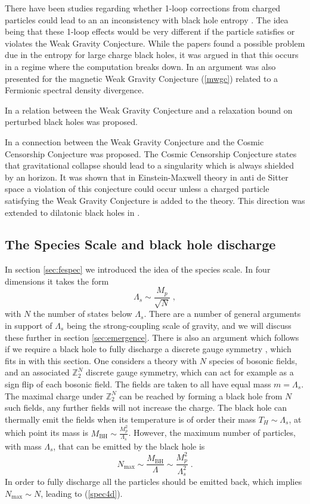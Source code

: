 \documentclass[11pt,a4paper]{article}
\numberwithin{equation}{section}
\numberwithin{table}{section}\setlength{\multlinegap}{25pt}
\newcommand{\be}{\begin{equation}}
\newcommand{\ee}{\end{equation}}
\begin{document}
There have been studies regarding whether 1-loop corrections from charged particles could lead to an an inconsistency with black hole entropy \cite{Shiu:2017toy,Cottrell:2016bty,Fisher:2017dbc}. The idea being that these 1-loop effects would be very different if the particle satisfies or violates the Weak Gravity Conjecture. While the papers found a possible problem due in the entropy for large charge black holes, it was argued in \cite{Shiu:2017toy,Cottrell:2016bty} that this occurs in a regime where the computation breaks down. In \cite{Cottrell:2016bty} an argument was also presented for the magnetic Weak Gravity Conjecture (\ref{mwgc}) related to a Fermionic spectral density divergence.

In \cite{Hod:2017uqc} a relation between the Weak Gravity Conjecture and a relaxation bound on perturbed black holes was proposed. 

In \cite{Crisford:2017zpi,Crisford:2017gsb} a connection between the Weak Gravity Conjecture and the Cosmic Censorship Conjecture \cite{PhysRevLett.14.57} was proposed. The Cosmic Censorship Conjecture states that gravitational collapse should lead to a singularity which is always shielded by an horizon. It was shown that in Einstein-Maxwell theory in anti de Sitter space a violation of this conjecture could occur unless a charged particle satisfying the Weak Gravity Conjecture is added to the theory. This direction was extended to dilatonic black holes in \cite{Yu:2018eqq}.


\subsection{The Species Scale and black hole discharge}

In section \ref{sec:fespec} we introduced the idea of the species scale. In four dimensions it takes the form
\be
\label{spec4d}
\Lambda_s \sim \frac{M_p}{\sqrt{N}} \;,
\ee
with $N$ the number of states below $\Lambda_s$. There are a number of general arguments in support of $\Lambda_s$ being the strong-coupling scale of gravity, and we will discuss these further in section \ref{sec:emergence}. There is also an argument which follows if we require a black hole to fully discharge a discrete gauge symmetry \cite{Dvali:2007hz}, which fits in with this section. One considers a theory with $N$ species of bosonic fields, and an associated $\mathbb{Z}^N_2$ discrete gauge symmetry, which can act for example as a sign flip of each bosonic field. The fields are taken to all have equal mass $m=\Lambda_s$. The maximal charge under $\mathbb{Z}^N_2$ can be reached by forming a black hole from $N$ such fields, any further fields will not increase the charge. The black hole can thermally emit the fields when its temperature is of order their mass $T_{H} \sim \Lambda_s$, at which point its mass is $M_{\mathrm{BH}} \sim \frac{M_p^2}{\Lambda_s}$. However, the maximum number of particles, with mass $\Lambda_s$, that can be emitted by the black hole is 
\be
N_{\mathrm{max}} \sim \frac{M_{\mathrm{BH}}}{\Lambda} \sim \frac{M_p^2}{\Lambda_s^2} \;.
\ee
In order to fully discharge all the particles should be emitted back, which implies $N_{\mathrm{max}} \sim N$, leading to (\ref{spec4d}).
\end{document}
